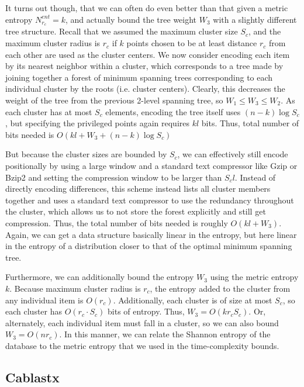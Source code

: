 \documentclass[review,preprint,12pt]{elsarticle}
\theoremstyle{definition}
\theoremstyle{remark}
\numberwithin{equation}{section}
\begin{document}
It turns out though, that we can often do even better than that given a metric entropy $N_{r_c}^{ent} = k$, and actually bound the tree weight $W_3$ with a slightly different tree structure.
Recall that we assumed the maximum cluster size $S_c$, and the maximum cluster radius is $r_c$ if $k$ points chosen to be at least distance $r_c$ from each other are used as the cluster centers.
We now consider encoding each item by its nearest neighbor within a cluster, which corresponds to a tree made by joining together a forest of minimum spanning trees corresponding to each individual cluster by the roots (i.e. cluster centers).
Clearly, this decreases the weight of the tree from the previous 2-level spanning tree, so $W_1 \le W_3 \le W_2$.
As each cluster has at most $S_c$ elements, encoding the tree itself uses $(n-k)\log S_c$, but specifying the privileged points again requires $kl$ bits.
Thus, total number of bits needed is $O(kl + W_3 + (n-k)\log S_c )$

But because the cluster sizes are bounded by $S_c$, we can effectively still encode positionally by using a large window and a standard text compressor like Gzip or Bzip2 and setting the compression window to be larger than $S_c l$.
Instead of directly encoding differences, this scheme instead lists all cluster members together and uses a standard text compressor to use the redundancy throughout the cluster, which allows us to not store the forest explicitly and still get compression.
Thus, the total number of bits needed is roughly $O(kl + W_3)$. Again, we can get a data structure basically linear in the entropy, but here linear in the entropy of a distribution closer to that of the optimal minimum spanning tree.

Furthermore, we can additionally bound the entropy $W_3$ using the metric entropy $k$.
Because maximum cluster radius is $r_c$, the entropy added to the cluster from any individual item is $O(r_c)$.
Additionally, each cluster is of size at most $S_c$, so each cluster has $O(r_c \cdot S_c)$ bits of entropy.
Thus, $W_3 = O(k r_c S_c)$.
Or, alternately, each individual item must fall in a cluster, so we can also bound $W_3 = O(n r_c)$.
In this manner, we can relate the Shannon entropy of the database to the metric entropy that we used in the time-complexity bounds.

\subsection{Cablastx}
\end{document}
